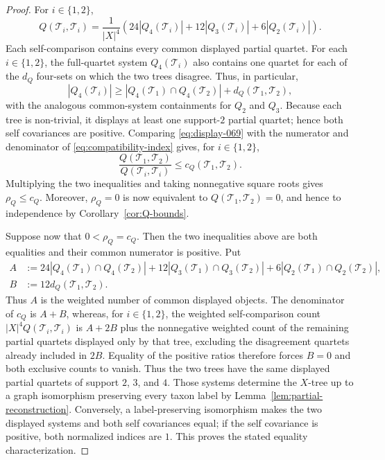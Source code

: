 \documentclass[12pt]{article}
\begin{document}
\begin{proof}
For $i\in\{1,2\}$,
\begin{equation}\label{eq:display-069}
Q(\mathcal T_i,\mathcal T_i)=\frac1{|X|^4}
\left(24|Q_4(\mathcal T_i)|+12|Q_3(\mathcal T_i)|+6|Q_2(\mathcal T_i)|\right).
\end{equation}
Each self-comparison contains every common displayed partial quartet.  For
each $i\in\{1,2\}$, the full-quartet system $Q_4(\mathcal T_i)$ also contains
one quartet for each of the $d_Q$ four-sets on which the two trees disagree.
Thus, in particular,
\begin{equation}\label{eq:display-070}
|Q_4(\mathcal T_i)|\ge
|Q_4(\mathcal T_1)\cap Q_4(\mathcal T_2)|+d_Q(\mathcal T_1,\mathcal T_2),
\end{equation}
with the analogous common-system containments for $Q_2$ and $Q_3$.
Because each tree is non-trivial, it displays at least one support-$2$ partial
quartet; hence both self covariances are positive.  Comparing \eqref{eq:display-069} with the numerator and
denominator of \eqref{eq:compatibility-index} gives, for $i\in\{1,2\}$,
\begin{equation}\label{eq:display-071}
\frac{Q(\mathcal T_1,\mathcal T_2)}{Q(\mathcal T_i,\mathcal T_i)}
\le c_Q(\mathcal T_1,\mathcal T_2).
\end{equation}
Multiplying the two inequalities and taking nonnegative square roots gives
$\rho_Q\le c_Q$.  Moreover, $\rho_Q=0$ is now equivalent to
$Q(\mathcal T_1,\mathcal T_2)=0$, and
hence to independence by Corollary~\ref{cor:Q-bounds}.

Suppose now that $0<\rho_Q=c_Q$.  Then the two inequalities above are both
equalities and their common numerator is positive.  Put
\begin{equation}\label{eq:display-072}
\begin{aligned}
A&:=24|Q_4(\mathcal T_1)\cap Q_4(\mathcal T_2)|
+12|Q_3(\mathcal T_1)\cap Q_3(\mathcal T_2)|
+6|Q_2(\mathcal T_1)\cap Q_2(\mathcal T_2)|,\\
B&:=12d_Q(\mathcal T_1,\mathcal T_2).
\end{aligned}
\end{equation}
Thus $A$ is the weighted number of common displayed objects.  The denominator
of $c_Q$ is $A+B$, whereas, for $i\in\{1,2\}$, the weighted self-comparison
count $|X|^4Q(\mathcal T_i,\mathcal T_i)$ is $A+2B$ plus the nonnegative weighted
count of the remaining partial quartets displayed only by that tree, excluding the
disagreement quartets already included in $2B$.  Equality of the positive
ratios therefore forces $B=0$ and both exclusive counts to vanish.  Thus the
two trees have the same displayed partial quartets of support $2$, $3$, and
$4$.  Those systems determine the $X$-tree up to a graph isomorphism
preserving every taxon label by Lemma~\ref{lem:partial-reconstruction}.
Conversely, a label-preserving isomorphism makes the two displayed systems and
both self covariances equal; if the self covariance is positive, both
normalized indices are $1$.  This proves the stated equality characterization.
\end{proof}
\end{document}
